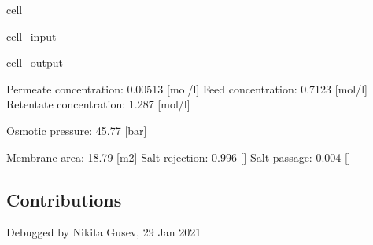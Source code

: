 \documentclass[letterpaper,10pt,english]{jupyterBook}
\begin{document}
\begin{sphinxuseclass}{cell}
\begin{sphinxVerbatimInput}
\begin{sphinxuseclass}{cell_input}
\begin{sphinxVerbatim}[commandchars=\\\{\}]
  
  
  
\end{sphinxVerbatim}

\end{sphinxuseclass}\end{sphinxVerbatimInput}
\begin{sphinxVerbatimOutput}

\begin{sphinxuseclass}{cell_output}
\begin{sphinxVerbatim}[commandchars=\\\{\}]
Permeate concentration:  0.00513  [mol/l]
Feed concentration:  0.7123  [mol/l]
Retentate concentration:  1.287  [mol/l]

Osmotic pressure:  45.77  [bar]

Membrane area:  18.79  [m\PYGZca{}2]
Salt rejection:  0.996 [\PYGZhy{}]
Salt passage:  0.004 [\PYGZhy{}]
\end{sphinxVerbatim}

\end{sphinxuseclass}\end{sphinxVerbatimOutput}

\end{sphinxuseclass}

\subsection{Contributions}
\label{\detokenize{Exercise_W3_2021:contributions}}
\sphinxAtStartPar
Debugged by Nikita Gusev, 29 Jan 2021
\end{document}
